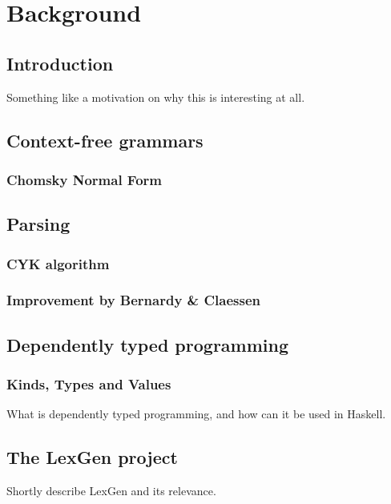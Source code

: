 \chapter{Background}

\section{Introduction}
Something like a motivation on why this is interesting at all.

\section{Context-free grammars}
\subsection{Chomsky Normal Form}

\section{Parsing}
\subsection{CYK algorithm}
\subsection{Improvement by Bernardy \& Claessen}

\section{Dependently typed programming}
\subsection{Kinds, Types and Values}
What is dependently typed programming, and how can it be used in Haskell.

\section{The LexGen project}
Shortly describe LexGen and its relevance.

